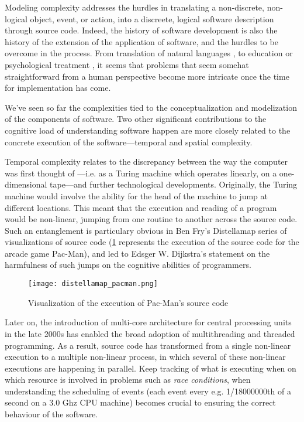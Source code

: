 Modeling complexity addresses the hurdles in translating a non-discrete, non-logical object, event, or action, into a discreete, logical software description through source code. Indeed, the history of software development is also the history of the extension of the application of software, and the hurdles to be overcome in the process. From translation of natural languages \citep{poibeau_machine_2017}, to education \citep{watters_teaching_2021} or psychological treatment \citep{weizenbaum_computer_1976}, it seems that problems that seem somehat straightforward from a human perspective become more intricate once the time for implementation has come.

We've seen so far the complexities tied to the conceptualization and modelization of the components of software. Two other significant contributions to the cognitive load of understanding software happen are more closely related to the concrete execution of the software—temporal and spatial complexity.

Temporal complexity relates to the discrepancy between the way the computer was first thought of —i.e. as a Turing machine which operates linearly, on a one-dimensional tape—and further technological developments. Originally, the Turing machine would involve the ability for the head of the machine to jump at different locations. This meant that the execution and reading of a program would be non-linear, jumping from one routine to another across the source code. Such an entanglement is particulary obvious in Ben Fry's Distellamap series of visualizations of source code (\ref{graphic:pacman-visualization} represents the execution of the source code for the arcade game Pac-Man), and led to Edsger W. Dijkstra's statement on the harmfulness of such jumps on the cognitive abilities of programmers.


\begin{figure}
    \texttt{[image: distellamap\_pacman.png]}
    \caption{Visualization of the execution of Pac-Man's source code}
    \label{graphic:pacman-visualization}
\end{figure}

Later on, the introduction of multi-core architecture for central processing units in the late 2000s has enabled the broad adoption of multithreading and threaded programming. As a result, source code has transformed from a single non-linear execution to a multiple non-linear process, in which several of these non-linear executions are happening in parallel. Keep tracking of what is executing when on which resource is involved in problems such as \emph{race conditions}, when understanding the scheduling of events (each event every e.g. 1/18000000th of a second on a 3.0 Ghz CPU machine) becomes crucial to ensuring the correct behaviour of the software.

